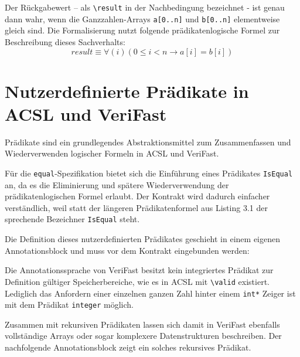 Der Rückgabewert -- als \lstinline{\result} in der Nachbedingung bezeichnet - ist genau dann wahr, wenn die Ganzzahlen-Arrays 
\lstinline{a[0..n]} und \lstinline{b[0..n]} elementweise gleich sind. Die Formalisierung nutzt folgende
prädikatenlogische Formel zur Beschreibung dieses Sachverhalts:
\[result \equiv \forall(i) (0 \leq i < n \rightarrow a[i] = b[i])\]



\section{Nutzerdefinierte Prädikate in ACSL und VeriFast}
\label{sec:design-by-contract:predicates}

Prädikate sind ein grundlegendes Abstraktionsmittel zum Zusammenfassen und Wiederverwenden logischer
Formeln in ACSL und VeriFast.

Für die \texttt{equal}-Spezifikation bietet sich die Einführung eines Prädikates \texttt{IsEqual} an,
da es die Eliminierung und spätere Wiederverwendung der prädikatenlogischen Formel erlaubt. Der Kontrakt
wird dadurch einfacher verständlich, weil statt der längeren Prädikatenformel aus Listing 3.1 der sprechende
Bezeichner \texttt{IsEqual} steht.



Die Definition dieses nutzerdefinierten Prädikates geschieht in einem eigenen Annotationsblock und muss vor
dem Kontrakt eingebunden werden:



Die Annotationssprache von VeriFast besitzt kein integriertes Prädikat zur Definition gültiger Speicherbereiche,
wie es in ACSL mit \lstinline{\valid} existiert. Lediglich das Anfordern einer einzelnen ganzen Zahl hinter
einem \lstinline{int*} Zeiger ist mit dem Prädikat \lstinline{integer} möglich.

Zusammen mit rekursiven Prädikaten lassen sich damit in VeriFast ebenfalls vollständige Arrays oder sogar komplexere
Datenstrukturen beschreiben. Der nachfolgende Annotationsblock zeigt ein solches rekursives Prädikat.



